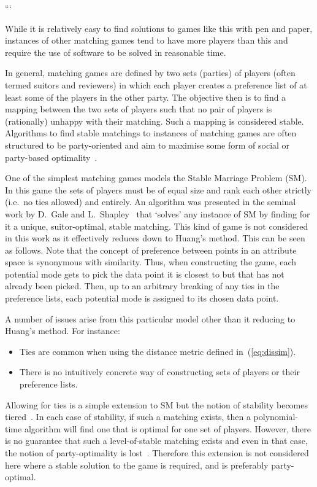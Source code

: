 ```

While it is relatively easy to find solutions to games like this with pen and
paper, instances of other matching games tend to have more players than this and
require the use of software to be solved in reasonable time.

In general, matching games are defined by two sets (parties) of players (often
termed suitors and reviewers) in which each player creates a preference list of
at least some of the players in the other party. The objective then is to find a
mapping between the two sets of players such that no pair of players is
(rationally) unhappy with their matching. Such a mapping is considered stable.
Algorithms to find stable matchings to instances of matching games are often
structured to be party-oriented and aim to maximise some form of social or
party-based optimality~\cite{Fuku2006,Gale1962,Kwanashie2015}.

One of the simplest matching games models the Stable Marriage Problem (SM). In
this game the sets of players must be of equal size and rank each other strictly
(i.e.\ no ties allowed) and entirely. An algorithm was presented in the seminal
work by D.\ Gale and L.\ Shapley~\cite{Gale1962} that `solves' any instance of
SM by finding for it a unique, suitor-optimal, stable matching. This kind of
game is not considered in this work as it effectively reduces down to Huang's
method. This can be seen as follows. Note that the concept of preference between
points in an attribute space is synonymous with similarity. Thus, when
constructing the game, each potential mode gets to pick the data point it is
closest to but that has not already been picked. Then, up to an arbitrary
breaking of any ties in the preference lists, each potential mode is assigned to
its chosen data point.

A number of issues arise from this particular model other than it reducing to
Huang's method. For instance:
\begin{itemize}
    \item Ties are common when using the distance metric defined
        in~(\ref{eq:dissim}).
    \item There is no intuitively concrete way of constructing sets of players
        or their preference lists.
\end{itemize}

Allowing for ties is a simple extension to SM but the notion of stability
becomes tiered~\cite{Iwama2016,Iwama1999}. In each case of stability, if such a
matching exists, then a polynomial-time algorithm will find one that is optimal
for one set of players. However, there is no guarantee that such a
level-of-stable matching exists and even in that case, the notion of
party-optimality is lost~\cite{Erdil2017}. Therefore this extension is not
considered here where a stable solution to the game is required, and is
preferably party-optimal.

